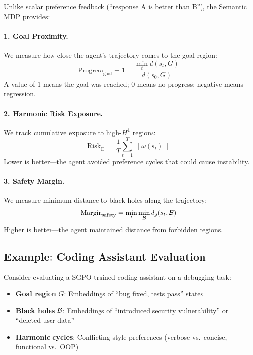 Unlike scalar preference feedback (``response A is better than B''), the Semantic MDP provides:

\paragraph{1. Goal Proximity.} We measure how close the agent's trajectory comes to the goal region:
\begin{equation}
\text{Progress}_{\text{goal}} = 1 - \frac{\min_t d(s_t, G)}{d(s_0, G)}
\end{equation}
A value of 1 means the goal was reached; 0 means no progress; negative means regression.

\paragraph{2. Harmonic Risk Exposure.} We track cumulative exposure to high-$H^1$ regions:
\begin{equation}
\text{Risk}_{\text{H}^1} = \frac{1}{T} \sum_{t=1}^{T} \|\omega(s_t)\|
\end{equation}
Lower is better---the agent avoided preference cycles that could cause instability.

\paragraph{3. Safety Margin.} We measure minimum distance to black holes along the trajectory:
\begin{equation}
\text{Margin}_{\text{safety}} = \min_t \min_{\mathcal{B}} d_g(s_t, \mathcal{B})
\end{equation}
Higher is better---the agent maintained distance from forbidden regions.

\subsection{Example: Coding Assistant Evaluation}

Consider evaluating a SGPO-trained coding assistant on a debugging task:
\begin{itemize}
    \item \textbf{Goal region} $G$: Embeddings of ``bug fixed, tests pass'' states
    \item \textbf{Black holes} $\mathcal{B}$: Embeddings of ``introduced security vulnerability'' or ``deleted user data''
    \item \textbf{Harmonic cycles}: Conflicting style preferences (verbose vs.\ concise, functional vs.\ OOP)
\end{itemize}

